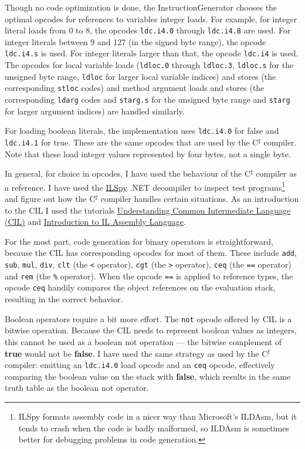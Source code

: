 \documentclass[a4paper,11pt]{article}
\begin{document}
Though no code optimization is done, the InstructionGenerator chooses the optimal opcodes for references to variables integer loads. For example, for integer literal loads from 0 to 8, the opcodes \verb,ldc.i4.0, through \verb,ldc.i4.8, are used. For integer literals between 9 and 127 (in the signed byte range), the opcode \verb,ldc.i4.s, is used. For integer literals larger than that, the opcode \verb,ldc.i4, is used. The opcodes for local variable loads (\verb,ldloc.0, through \verb,ldloc.3,, \verb,ldloc.s, for the unsigned byte range, \verb,ldloc, for larger local variable indices) and stores (the corresponding \verb,stloc, codes) and method argument loads and stores (the corresponding \verb,ldarg, codes and \verb,starg.s, for the unsigned byte range and \verb,starg, for larger argument indices) are handled similarly.

For loading boolean literals, the implementation uses \verb,ldc.i4.0, for false and \verb,ldc.i4.1, for true. These are the same opcodes that are used by the C$^\sharp$ compiler. Note that these load integer values represented by four bytes, not a single byte.

In general, for choice in opcodes, I have used the behaviour of the C$^\sharp$ compiler as a reference. I have used the \href{http://ilspy.net/}{ILSpy} .NET decompiler to inspect test programs\footnote{ILSpy formats assembly code in a nicer way than Microsoft's ILDAsm, but it tends to crash when the code is badly malformed, so ILDAsm is sometimes better for debugging problems in code generation.} and figure out how the C$^\sharp$ compiler handles certain situations. As an introduction to the CIL I used the tutorials \href{http://www.codeproject.com/Articles/362076/Understanding-Common-Intermediate-Language-CIL}{Understanding Common Intermediate Language (CIL)} and \href{http://www.codeproject.com/Articles/3778/Introduction-to-IL-Assembly-Language}{Introduction to IL Assembly Language}.

For the most part, code generation for binary operators is straightforward, because the CIL has corresponding opcodes for most of them. These include \verb,add,, \verb,sub,, \verb,mul,, \verb,div,, \verb,clt, (the \verb,<, operator), \verb,cgt, (the \verb,>, operator), \verb,ceq, (the \verb,==, operator) and \verb,rem, (the \verb,%, operator). When the opcode \verb,==, is applied to reference types, the opcode \verb,ceq, handily compares the object references on the evaluation stack, resulting in the correct behavior.

Boolean operators require a bit more effort. The \verb,not, opcode offered by CIL is a bitwise operation. Because the CIL needs to represent boolean values as integers, this cannot be used as a boolean not operation --- the bitwise complement of \textbf{true} would not be \textbf{false}. I have used the same strategy as used by the C$^\sharp$ compiler: emitting an \verb,ldc.i4.0, load opcode and an \verb,ceq, opcode, effectively comparing the boolean value on the stack with \textbf{false}, which results in the same truth table as the boolean not operator.
\end{document}
